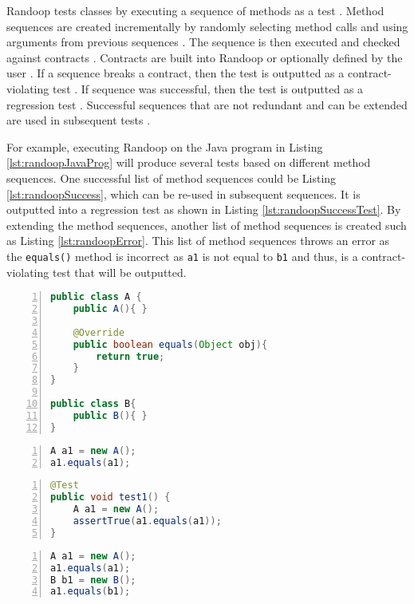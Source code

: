 Randoop tests classes by executing a sequence of methods as a test \cite{randoopJava}. Method sequences are created incrementally by randomly selecting method calls and using arguments from previous sequences \cite{randoopJava}.
The sequence is then executed and checked against contracts \cite{randoopAll}.
Contracts are built into Randoop or optionally defined by the user \cite{randoopAll}.
If a sequence breaks a contract, then the test is outputted as a contract-violating test \cite{randoopAll}. If sequence was successful, then the test is outputted as a regression test \cite{randoopAll}.
Successful sequences that are not redundant and can be extended are used in subsequent tests \cite{randoopAll}.


For example, executing Randoop on the Java program in Listing \ref{lst:randoopJavaProg} will produce several tests based on different method sequences.
One successful list of method sequences could be Listing \ref{lst:randoopSuccess},  which can be re-used in subsequent sequences. It is outputted into a regression test as shown in Listing \ref{lst:randoopSuccessTest}.
By extending the method sequences, another list of method sequences is created such as Listing \ref{lst:randoopError}.
This list of method sequences throws an error as the \texttt{equals()} method is incorrect as \texttt{a1} is not equal to \texttt{b1} and thus, is a contract-violating test that will be outputted.

\begin{lstlisting}[language=Java, tabsize=3, numbers=left,
label={lst:randoopJavaProg}, caption={Example Java class}]
public class A {
	public A(){ }
		
	@Override
	public boolean equals(Object obj){
		return true;
	}
}

public class B{
	public B(){ }
}
\end{lstlisting}

\begin{lstlisting}[language=Java, tabsize=3, numbers=left,
label={lst:randoopSuccess}, caption={Successful method sequence for testing Listing \ref{lst:randoopJavaProg}}]
A a1 = new A();
a1.equals(a1);
\end{lstlisting}

\begin{lstlisting}[language=Java, tabsize=3, numbers=left,
label={lst:randoopSuccessTest}, caption={Test output for the successful method sequence in Listing \ref{lst:randoopSuccess}}]
@Test
public void test1() {
	A a1 = new A();
	assertTrue(a1.equals(a1));
}
\end{lstlisting}

\begin{lstlisting}[language=Java, tabsize=3, numbers=left,
label={lst:randoopError}, caption={Contract violating method sequence for testing Listing \ref{lst:randoopJavaProg}}]
A a1 = new A();
a1.equals(a1);
B b1 = new B();
a1.equals(b1);
\end{lstlisting}


